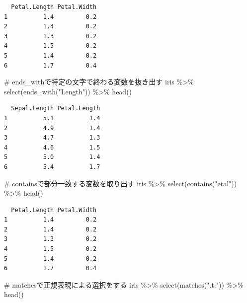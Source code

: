 \documentclass[
  a4paper,
]{ltjsbook}
\newenvironment{Shaded}{\begin{snugshade}}{\end{snugshade}}
\newcommand{\CommentTok}[1]{\textcolor[rgb]{0.37,0.37,0.37}{#1}}
\newcommand{\FunctionTok}[1]{\textcolor[rgb]{0.28,0.35,0.67}{#1}}
\newcommand{\NormalTok}[1]{\textcolor[rgb]{0.00,0.23,0.31}{#1}}
\newcommand{\SpecialCharTok}[1]{\textcolor[rgb]{0.37,0.37,0.37}{#1}}
\newcommand{\StringTok}[1]{\textcolor[rgb]{0.13,0.47,0.30}{#1}}
\begin{document}
\begin{verbatim}
  Petal.Length Petal.Width
1          1.4         0.2
2          1.4         0.2
3          1.3         0.2
4          1.5         0.2
5          1.4         0.2
6          1.7         0.4
\end{verbatim}

\begin{Shaded}
\begin{Highlighting}[]
\CommentTok{\# ends\_withで特定の文字で終わる変数を抜き出す}
\NormalTok{iris }\SpecialCharTok{\%\textgreater{}\%}
  \FunctionTok{select}\NormalTok{(}\FunctionTok{ends\_with}\NormalTok{(}\StringTok{"Length"}\NormalTok{)) }\SpecialCharTok{\%\textgreater{}\%}
  \FunctionTok{head}\NormalTok{()}
\end{Highlighting}
\end{Shaded}

\begin{verbatim}
  Sepal.Length Petal.Length
1          5.1          1.4
2          4.9          1.4
3          4.7          1.3
4          4.6          1.5
5          5.0          1.4
6          5.4          1.7
\end{verbatim}

\begin{Shaded}
\begin{Highlighting}[]
\CommentTok{\# containsで部分一致する変数を取り出す}
\NormalTok{iris }\SpecialCharTok{\%\textgreater{}\%}
  \FunctionTok{select}\NormalTok{(}\FunctionTok{contains}\NormalTok{(}\StringTok{"etal"}\NormalTok{)) }\SpecialCharTok{\%\textgreater{}\%}
  \FunctionTok{head}\NormalTok{()}
\end{Highlighting}
\end{Shaded}

\begin{verbatim}
  Petal.Length Petal.Width
1          1.4         0.2
2          1.4         0.2
3          1.3         0.2
4          1.5         0.2
5          1.4         0.2
6          1.7         0.4
\end{verbatim}

\begin{Shaded}
\begin{Highlighting}[]
\CommentTok{\# matchesで正規表現による選択をする}
\NormalTok{iris }\SpecialCharTok{\%\textgreater{}\%}
  \FunctionTok{select}\NormalTok{(}\FunctionTok{matches}\NormalTok{(}\StringTok{".t."}\NormalTok{)) }\SpecialCharTok{\%\textgreater{}\%}
  \FunctionTok{head}\NormalTok{()}
\end{Highlighting}
\end{Shaded}
\end{document}
